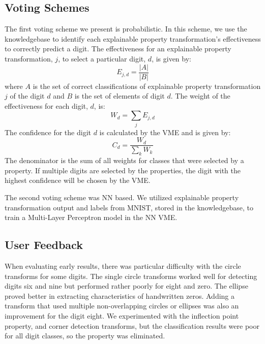 \documentclass[conference]{IEEEtran}
\begin{document}
\subsection{Voting Schemes}
\label{subsection:Voting}

The first voting scheme we present is probabilistic.  In this scheme, we use the knowledgebase to identify each explainable property transformation's effectiveness to correctly predict a digit.   The effectiveness for an explainable property transformation, $j$, to select a particular digit, $d$,  is given by:
\begin{equation}\label{effectiveness}
E_{j,d}  = \frac{|A|}{|B|}
\end{equation}
where $A$ is the set of correct classifications of explainable property transformation $j$ of the digit $d$ and $B$ is the set of elements of digit $d$.  The weight of the effectiveness for each digit, $d$, is:
\begin{equation}\label{weight}
W_d=\sum_j E_{j, d}
\end{equation}
The confidence for the digit $d$ is calculated by the VME and is given by:
\begin{equation}\label{conf}
C_d=\frac{W_d}{\sum\limits_kW_k}
\end{equation}
The denominator is the sum of all weights for classes that were selected by a property.  If multiple digits are selected by the properties, the digit with the highest confidence will be chosen by the VME.

The second voting scheme was NN based.  We utilized explainable property transformation output and labels from MNIST, stored in the knowledgebase, to train a Multi-Layer Perceptron model in the NN VME.

\subsection{ User Feedback}

When evaluating early results, there was particular difficulty with the circle transforms for some digits.   The single circle transforms worked well for detecting digits six and nine but performed rather poorly for eight and zero.  The ellipse proved better in extracting characteristics of handwritten zeros.   Adding a transform that used multiple non-overlapping circles or ellipses was also an improvement for the digit eight.  We experimented with the inflection point property, and corner detection transforms, but the classification results were poor for all digit classes, so the property was eliminated.
\end{document}

